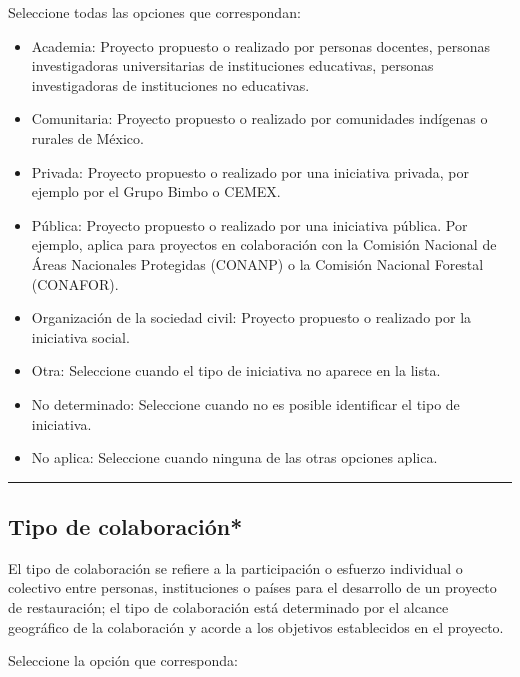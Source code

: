 \documentclass[
]{book}
\providecommand{\tightlist}{%
  \setlength{\itemsep}{0pt}\setlength{\parskip}{0pt}}
\begin{document}
Seleccione todas las opciones que correspondan:

\begin{itemize}
\tightlist
\item
  Academia: Proyecto propuesto o realizado por personas docentes, personas investigadoras universitarias de instituciones educativas, personas investigadoras de instituciones no educativas.
\item
  Comunitaria: Proyecto propuesto o realizado por comunidades indígenas o rurales de México.
\item
  Privada: Proyecto propuesto o realizado por una iniciativa privada, por ejemplo por el Grupo Bimbo o CEMEX.
\item
  Pública: Proyecto propuesto o realizado por una iniciativa pública. Por ejemplo, aplica para proyectos en colaboración con la Comisión Nacional de Áreas Nacionales Protegidas (CONANP) o la Comisión Nacional Forestal (CONAFOR).
\item
  Organización de la sociedad civil: Proyecto propuesto o realizado por la iniciativa social.
\item
  Otra: Seleccione cuando el tipo de iniciativa no aparece en la lista.
\item
  No determinado: Seleccione cuando no es posible identificar el tipo de iniciativa.
\item
  No aplica: Seleccione cuando ninguna de las otras opciones aplica.
\end{itemize}

\begin{center}\rule{0.5\linewidth}{0.5pt}\end{center}

\hypertarget{tipo-de-colaboraciuxf3n}{%
\subsection*{\texorpdfstring{{Tipo de colaboración*}}{Tipo de colaboración*}}\label{tipo-de-colaboraciuxf3n}}

El tipo de colaboración se refiere a la participación o esfuerzo individual o colectivo entre personas, instituciones o países para el desarrollo de un proyecto de restauración; el tipo de colaboración está determinado por el alcance geográfico de la colaboración y acorde a los objetivos establecidos en el proyecto.

Seleccione la opción que corresponda:
\end{document}
